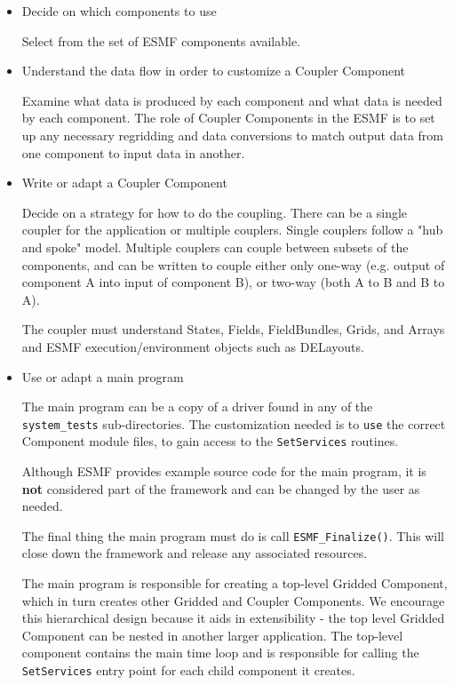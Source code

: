 \begin{itemize}

\item Decide on which components to use 

Select from the set of ESMF components available.

\item Understand the data flow in order to customize a Coupler Component

Examine what data is produced by each component and what data is
needed by each component.  The role of Coupler Components in the
ESMF is to set up any necessary regridding and data conversions
to match output data from one component to input data in another.

\item Write or adapt a Coupler Component

Decide on a strategy for how to do the coupling.  There can be a single
coupler for the application or multiple couplers.
Single couplers follow a "hub and
spoke" model.
Multiple couplers can couple between subsets of the components, and
can be written to couple either only one-way
(e.g. output of component A into input of component B), or two-way
(both A to B and B to A).  

The coupler must understand States, Fields, FieldBundles, 
Grids, and Arrays and ESMF execution/environment objects
such as DELayouts.    

\item Use or adapt a main program 

The main program can be a copy of a driver found in any of the
{\tt system\_tests} sub-directories.  The customization needed is to
{\tt use} the correct Component module files, to gain access to the
{\tt SetServices} routines. 

Although ESMF provides example source code for the main program, it is
{\bf not} considered part of the framework and can be changed by
the user as needed.

The final thing the main program must do is call {\tt ESMF\_Finalize()}.
This will close down the framework and release any associated resources.

The main program is responsible for creating a top-level
Gridded Component, which in turn creates other Gridded and Coupler 
Components.  We encourage this hierarchical design because it
aids in extensibility - the top level Gridded Component can be
nested in another larger application.
The top-level component contains the main time loop and is 
responsible for calling the
{\tt SetServices} entry point for each child component it creates.

\end{itemize}



